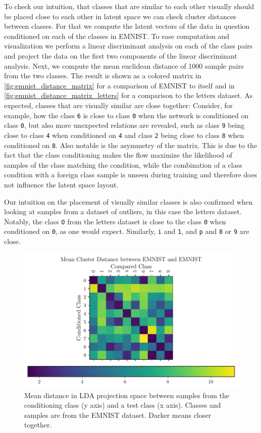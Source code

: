 To check our intuition, that classes that are similar to each other visually
should be placed close to each other in latent space we can check cluster
distances between classes. For that we compute the latent vectors of the data
in question conditioned on each of the classes in EMNIST. To ease computation
and visualization we perform a linear discriminant analysis on each of the class
pairs and project the data on the first two components of the linear
discriminant analysis. Next, we compute the mean euclidean distance of 1000
sample pairs from the two classes. The result is shown as a colored matrix in
\autoref{fig:emnist_distance_matrix} for a comparison of EMNIST to itself and
in \autoref{fig:emnist_distance_matrix_letters} for a comparison to the letters
dataset. As expected, classes that are visually similar are close together:
Consider, for example, how the class \texttt{6} is close to class \texttt{0}
when the network is conditioned on class \texttt{0}, but also more unexpected
relations are revealed, such as class \texttt{9} being
close to class \texttt{4} when conditioned on \texttt{4} and class \texttt{2}
being close to class \texttt{8} when
conditioned on \texttt{8}. Also notable is the asymmetry of the matrix. This is due to
the fact that the class conditioning makes the flow maximize the likelihood of
samples of the class matching the condition, while the combination of a class
condition with a foreign class sample is unseen during training and therefore
does not influence the latent space layout.

Our intuition on the placement of visually similar classes is also confirmed
when looking at samples from a dataset of outliers, in this case the letters
dataset. Notably, the class \texttt{O} from the letters dataset is close to the
class \texttt{0} when conditioned on \texttt{0}, as one would expect.
Similarly, \texttt{i} and \texttt{1}, and \texttt{p} and \texttt{8} or
\texttt{9} are close.

\begin{figure}[htpb]
	\centering
	\includegraphics{figures/samples/emnist_distance_matrix_EMNIST_lda.pdf}
	\caption{Mean distance in LDA projection space between samples from the
		conditioning class (y axis) and a test class (x axis). Classes and
		samples are from the EMNIST dataset. Darker means closer
		together.}%
	\label{fig:emnist_distance_matrix}
\end{figure}

